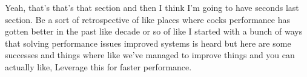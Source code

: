 \begin{subappendices}
Yeah, that's that's that section and then I think I'm going to have seconds last section. Be a sort of retrospective of like places where cocks performance has gotten better in the past like decade or so of like I started with a bunch of ways that solving performance issues improved systems is heard but here are some successes and things where like we've managed to improve things and you can actually like, Leverage this for faster performance.


\end{subappendices}
